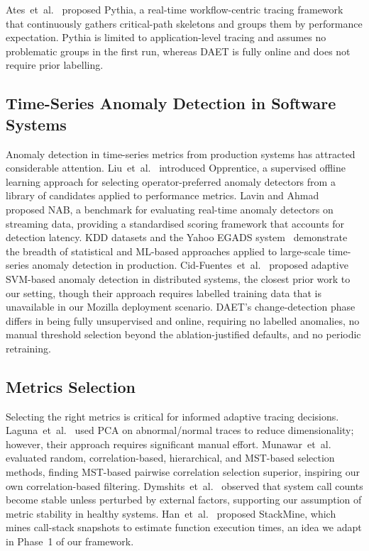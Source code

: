 \documentclass[a4paper,fleqn]{cas-sc}
\theoremstyle{plain}
\begin{document}
Ates~et~al.~\cite{ates2019automated} proposed Pythia, a real-time
workflow-centric tracing framework that continuously gathers critical-path
skeletons and groups them by performance expectation.
Pythia is limited to application-level tracing and assumes no problematic
groups in the first run, whereas DAET is fully online and does not require
prior labelling.

\subsection{Time-Series Anomaly Detection in Software Systems}

Anomaly detection in time-series metrics from production systems has attracted
considerable attention.
Liu~et~al.~\cite{liu2015opprentice} introduced Opprentice, a supervised offline
learning approach for selecting operator-preferred anomaly detectors from
a library of candidates applied to performance metrics.
Lavin and Ahmad~\cite{lavin2015evaluating} proposed NAB, a benchmark for
evaluating real-time anomaly detectors on streaming data, providing a
standardised scoring framework that accounts for detection latency.
KDD datasets and the Yahoo EGADS system~\cite{laptev2015generic} demonstrate
the breadth of statistical and ML-based approaches applied to large-scale
time-series anomaly detection in production.
Cid-Fuentes~et~al.~\cite{cid2018adaptive} proposed adaptive SVM-based anomaly
detection in distributed systems, the closest prior work to our setting,
though their approach requires labelled training data that is unavailable
in our Mozilla deployment scenario.
DAET's change-detection phase differs in being fully unsupervised and online,
requiring no labelled anomalies, no manual threshold selection beyond the
ablation-justified defaults, and no periodic retraining.

\subsection{Metrics Selection}
Selecting the right metrics is critical for informed adaptive tracing
decisions.
Laguna~et~al.~\cite{laguna2013automatic} used PCA on abnormal/normal traces
to reduce dimensionality; however, their approach requires significant manual
effort.
Munawar~et~al.~\cite{munawar2009filtering} evaluated random, correlation-based,
hierarchical, and MST-based selection methods, finding MST-based pairwise
correlation selection superior, inspiring our own correlation-based filtering.
Dymshits~et~al.~\cite{dymshits2017process} observed that system call counts
become stable unless perturbed by external factors, supporting our assumption
of metric stability in healthy systems.
Han~et~al.~\cite{han2012performance} proposed StackMine, which mines call-stack
snapshots to estimate function execution times, an idea we adapt in Phase~1
of our framework.
\end{document}

